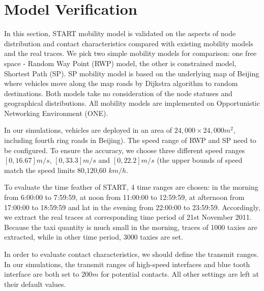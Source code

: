 \section{Model Verification}
\label{section_model_varification}
In this section, START mobility model is validated on the aspects of node distribution and contact characteristics compared with existing mobility models and the real traces. We pick two simple mobility models for comparison: one free space - Random Way Point (RWP) model, the other is constrained model, Shortest Path (SP).  SP mobility model is based on the underlying map of Beijing where vehicles move along the map roads by Dijkstra algorithm to random destinations. Both models take no consideration of the node statuses and geographical distributions. All mobility models are implemented on Opportunistic Networking Environment (ONE)\cite{KeranenOtt-155}.

In our simulations, vehicles are deployed in an area of $24,000\times 24,000 m^2$, including fourth ring roads in Beijing). The speed range of RWP and SP need to be configured.
To ensure the accuracy, we choose three different speed ranges $[0,16.67]m/s$, $[0,33.3]m/s$ and $[0,22.2]m/s$ (the upper bounds of speed match the speed limits $80$,$120$,$60$ $km/h$. 

To evaluate the time feather of START,  4 time ranges are chosen: in the morning from 6:00:00 to 7:59:59, at noon from 11:00:00 to 12:59:59, at afternoon from 17:00:00 to 18:59:59 and lat in the evening from 22:00:00 to 23:59:59. Accordingly, we extract the real traces at corresponding time period of 21st November 2011. Because the taxi quantity is much small in the morning, traces of 1000 taxies are extracted, while in other time period, 3000 taxies are set. 

In order to evaluate contact characteristics, we should define the transmit ranges.
In our simulations, the transmit ranges of high-speed interfaces and blue tooth interface are both set to $200m$ for potential contacts.
All other settings are left at their default values.


